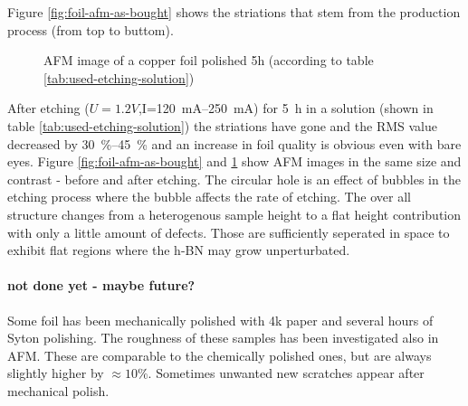 Figure \ref{fig:foil-afm-as-bought} shows the striations that stem from the production process (from top to buttom).
\begin{figure}[] \centering
	\caption{AFM image of a copper foil polished 5h (according to table \ref{tab:used-etching-solution})}
	\label{fig:foil-afm-polished}
\end{figure}
After etching ($U=1.2V$,I=\SIrange{120}{250}{\mA}) for \SI{5}{\hour} in a solution (shown in table \ref{tab:used-etching-solution}) the striations have gone and the RMS value decreased by \SIrange{30}{45}{\percent} and an increase in foil quality is obvious even with bare eyes. Figure \ref{fig:foil-afm-as-bought} and \ref{fig:foil-afm-polished} show AFM images in the same size and contrast - before and after etching.
The circular hole is an effect of bubbles in the etching process where the bubble affects the rate of etching. The over all structure changes from a heterogenous sample height to a flat height contribution with only a little amount of defects. Those are sufficiently seperated in space to exhibit flat regions where the h-BN may grow unperturbated.



\paragraph{not done yet - maybe future?}
Some foil has been mechanically polished with 4k paper and several hours of Syton polishing. The roughness of these samples has been investigated also in AFM. These are comparable to the chemically polished ones, but are always slightly higher by $\approx 10\%$. Sometimes unwanted new scratches appear after mechanical polish.

